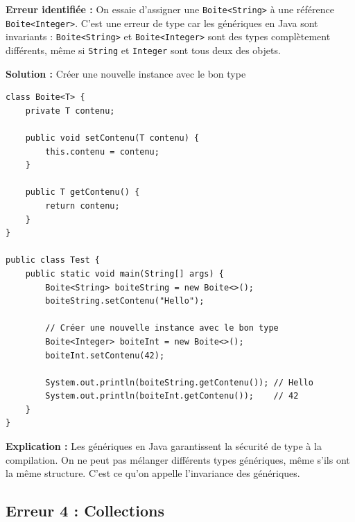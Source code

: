 \documentclass[11pt,a4paper]{article}
\begin{document}
\begin{correctionbox}
\textbf{Erreur identifiée :} On essaie d'assigner une \texttt{Boite<String>} à une référence \texttt{Boite<Integer>}. C'est une erreur de type car les génériques en Java sont invariants : \texttt{Boite<String>} et \texttt{Boite<Integer>} sont des types complètement différents, même si \texttt{String} et \texttt{Integer} sont tous deux des objets.

\textbf{Solution :} Créer une nouvelle instance avec le bon type

\begin{lstlisting}
class Boite<T> {
    private T contenu;
    
    public void setContenu(T contenu) {
        this.contenu = contenu;
    }
    
    public T getContenu() {
        return contenu;
    }
}

public class Test {
    public static void main(String[] args) {
        Boite<String> boiteString = new Boite<>();
        boiteString.setContenu("Hello");
        
        // Créer une nouvelle instance avec le bon type
        Boite<Integer> boiteInt = new Boite<>();
        boiteInt.setContenu(42);
        
        System.out.println(boiteString.getContenu()); // Hello
        System.out.println(boiteInt.getContenu());    // 42
    }
}
\end{lstlisting}

\textbf{Explication :} Les génériques en Java garantissent la sécurité de type à la compilation. On ne peut pas mélanger différents types génériques, même s'ils ont la même structure. C'est ce qu'on appelle l'invariance des génériques.
\end{correctionbox}

\subsection{Erreur 4 : Collections}
\end{document}
